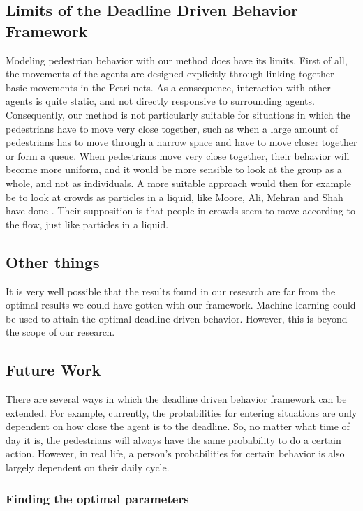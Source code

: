 \documentclass[11pt]{book}
\begin{document}
\subsection{Limits of the Deadline Driven Behavior Framework}
Modeling pedestrian behavior with our method does have its limits. First of all, the movements of the agents are designed explicitly through linking together basic movements in the Petri nets. As a consequence, interaction with other agents is quite static, and not directly responsive to surrounding agents. Consequently, our method is not particularly suitable for situations in which the pedestrians have to move very close together, such as when a large amount of pedestrians has to move through a narrow space and have to move closer together or form a queue. When pedestrians move very close together, their behavior will become more uniform, and it would be more sensible to look at the group as a whole, and not as individuals. A more suitable approach would then for example be to look at crowds as particles in a liquid, like Moore, Ali, Mehran and Shah have done \cite{Moore:2011:VCS:2043174.2043192}. Their supposition is that people in crowds seem to move according to the flow, just like particles in a liquid.

\subsection{Other things}
It is very well possible that the results found in our research are far from the optimal results we could have gotten with our framework.  Machine learning could be used to attain the optimal deadline driven behavior. However, this is beyond the scope of our research.


\subsection{Future Work}
There are several ways in which the deadline driven behavior framework can be extended. For example, currently, the probabilities for entering situations are only dependent on how close the agent is to the deadline. So, no matter what time of day it is, the pedestrians will always have the same probability to do a certain action. However, in real life, a person's probabilities for certain behavior is also largely dependent on their daily cycle.

\subsubsection{Finding the optimal parameters}
\end{document}
